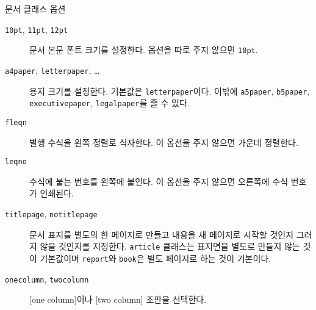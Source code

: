 \begin{table}[!bp]
\caption{문서 클래스 옵션} \label{options}
\begin{lined}{\textwidth}
\begin{description}
\item[\normalfont\texttt{10pt}, \texttt{11pt}, \texttt{12pt}] \quad 
  문서 본문 폰트 크기를 설정한다. 옵션을 따로 주지 않으면 \texttt{10pt}.
\item[\normalfont\texttt{a4paper}, \texttt{letterpaper}, \ldots] \quad 
  용지 크기를 설정한다. 기본값은 \texttt{letterpaper}이다. 이밖에 
  \texttt{a5paper}, \texttt{b5paper}, \texttt{executivepaper},
  \texttt{legalpaper}를 줄 수 있다.
   

\item[\normalfont\texttt{fleqn}] \quad 
  별행 수식을 왼쪽 정렬로 식자한다. 이 옵션을 주지 않으면 가운데 정렬한다.

\item[\normalfont\texttt{leqno}] \quad 
  수식에 붙는 번호를 왼쪽에 붙인다. 이 옵션을 주지 않으면 오른쪽에 수식 번호가 인쇄된다.

\item[\normalfont\texttt{titlepage}, \texttt{notitlepage}] \quad 
  문서 표지를 별도의 한 페이지로 만들고 내용을 새 페이지로 시작할 것인지 그러지 않을 것인지를 지정한다.
  \texttt{article} 클래스는 표지면을 별도로 만들지 않는 것이 기본값이며 \texttt{report}와
  \texttt{book}은 별도 페이지로 하는 것이 기본이다.

\item[\normalfont\texttt{onecolumn}, \texttt{twocolumn}] \quad 
  [one column]이나 [two column] 조판을 선택한다.


\end{description}
\end{lined}
\end{table}
